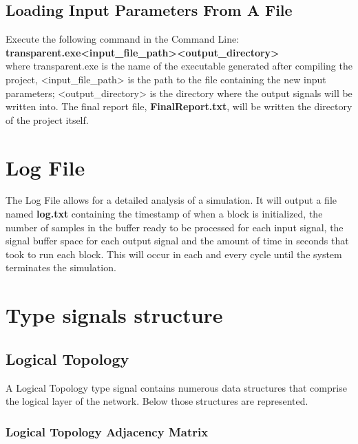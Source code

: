 

\subsection{Loading Input Parameters From A File}
 Execute the following command in the Command Line:\\

\textbf{transparent.exe<input\_file\_path><output\_directory>}\\

where transparent.exe is the name of the executable generated after compiling the project, <input\_file\_path> is the path to the file containing the new input parameters; <output\_directory> is the directory where the output signals will be written into. The final report file, \textbf{FinalReport.txt}, will be written the directory of the project itself.

\section{Log File}
\label{lf}
The Log File allows for a detailed analysis of a simulation. It will output a file named \textbf{log.txt} containing the timestamp of when a block is initialized, the number of samples in the buffer ready to be processed for each input signal, the signal buffer space for each output signal and the amount of time in seconds that took to run each block. This will occur in each and every cycle until the system terminates the simulation. 

\section{Type signals structure}
\label{tss}

\subsection{Logical Topology}

A Logical Topology type signal contains numerous data structures that comprise the logical layer of the network. Below those structures are represented.

\subsubsection{Logical Topology Adjacency Matrix}

